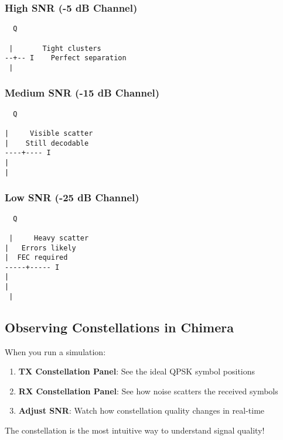 \subsubsection{High SNR (-5 dB Channel)}\label{high-snr--5-db-channel}

\begin{verbatim}
  Q
  
 |       Tight clusters
--+-- I    Perfect separation
 | 
\end{verbatim}

\subsubsection{Medium SNR (-15 dB
Channel)}\label{medium-snr--15-db-channel}

\begin{verbatim}
  Q
  
|     Visible scatter
|    Still decodable
----+---- I
| 
|
\end{verbatim}

\subsubsection{Low SNR (-25 dB Channel)}\label{low-snr--25-db-channel}

\begin{verbatim}
  Q
  
 |     Heavy scatter
|   Errors likely
|  FEC required
-----+----- I
|
|
 |
\end{verbatim}

\subsection{Observing Constellations in
Chimera}\label{observing-constellations-in-chimera}

When you run a simulation:

\begin{enumerate}
\def\labelenumi{\arabic{enumi}.}
\tightlist
\item
  \textbf{TX Constellation Panel}: See the ideal QPSK symbol positions
\item
  \textbf{RX Constellation Panel}: See how noise scatters the received
  symbols
\item
  \textbf{Adjust SNR}: Watch how constellation quality changes in
  real-time
\end{enumerate}

The constellation is the most intuitive way to understand signal
quality!

